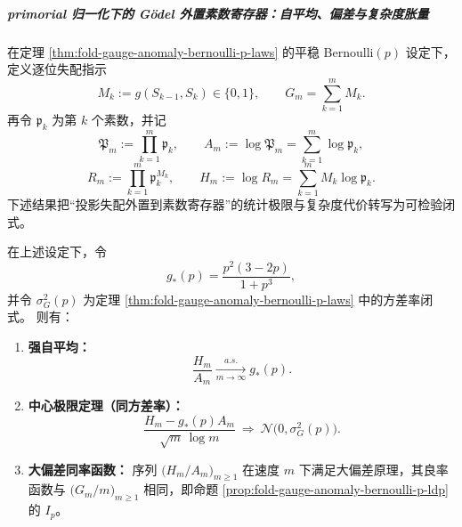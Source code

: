 \subparagraph{primorial 归一化下的 Gödel 外置素数寄存器：自平均、偏差与复杂度胀量}
在定理 \ref{thm:fold-gauge-anomaly-bernoulli-p-laws} 的平稳 Bernoulli\((p)\) 设定下，定义逐位失配指示
\[
M_k:=g(S_{k-1},S_k)\in\{0,1\},\qquad
G_m=\sum_{k=1}^{m}M_k.
\]
再令 \(\mathfrak p_k\) 为第 \(k\) 个素数，并记
\[
\mathfrak P_m:=\prod_{k=1}^{m}\mathfrak p_k,\qquad
A_m:=\log \mathfrak P_m=\sum_{k=1}^{m}\log \mathfrak p_k,
\]
\[
R_m:=\prod_{k=1}^{m}\mathfrak p_k^{M_k},\qquad
H_m:=\log R_m=\sum_{k=1}^{m}M_k\log \mathfrak p_k.
\]
下述结果把“投影失配外置到素数寄存器”的统计极限与复杂度代价转写为可检验闭式。

\begin{theorem}\label{thm:fold-gauge-anomaly-bernoulli-p-primorial-godel-laws}
在上述设定下，令
\[
g_\ast(p)=\frac{p^2(3-2p)}{1+p^3},
\]
并令 \(\sigma_G^2(p)\) 为定理 \ref{thm:fold-gauge-anomaly-bernoulli-p-laws} 中的方差率闭式。
则有：
\begin{enumerate}
  \item \textbf{强自平均：}
  \[
  \frac{H_m}{A_m}\xrightarrow[m\to\infty]{a.s.}g_\ast(p).
  \]
  \item \textbf{中心极限定理（同方差率）：}
  \[
  \frac{H_m-g_\ast(p)A_m}{\sqrt m\,\log m}
  \ \Rightarrow\
  \mathcal N\!\bigl(0,\sigma_G^2(p)\bigr).
  \]
  \item \textbf{大偏差同率函数：}
  序列 \(\bigl(H_m/A_m\bigr)_{m\ge1}\) 在速度 \(m\) 下满足大偏差原理，其良率函数与
  \(\bigl(G_m/m\bigr)_{m\ge1}\) 相同，即命题
  \ref{prop:fold-gauge-anomaly-bernoulli-p-ldp} 的 \(I_p\)。
\end{enumerate}
\end{theorem}
